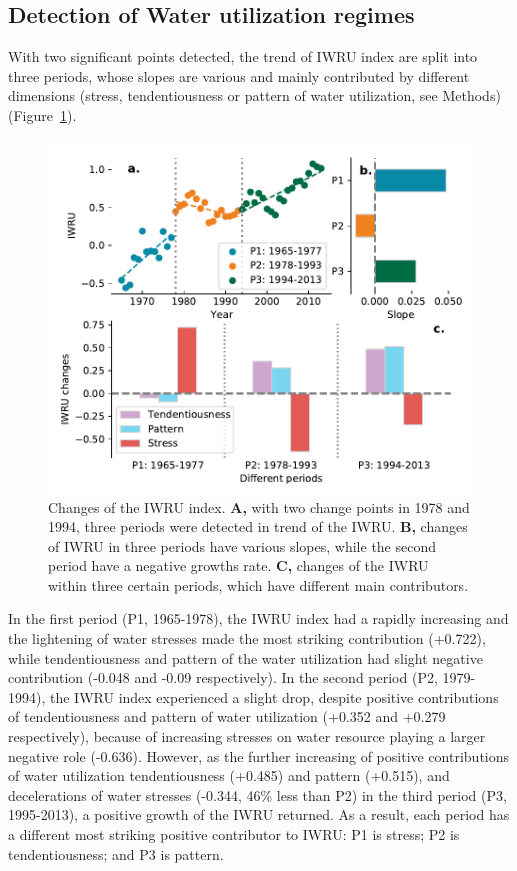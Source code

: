 \documentclass[9pt, twocolumn, twoside, lineno]{pnas-new}
\begin{document}
\subsection*{Detection of Water utilization regimes}
With two significant points detected, the trend of IWRU index are split into three periods, whose slopes are various and mainly contributed by different dimensions (stress, tendentiousness or pattern of water utilization, see Methods) (Figure~\ref{fig:IWRU}).
\begin{figure}%
	\centering
	\includegraphics[width=\linewidth]{../../figures/main_text/index.pdf}
	\caption{Changes of the IWRU index. 
	\textbf{A,} with two change points in 1978 and 1994, three periods were detected in trend of the IWRU.
	\textbf{B,} changes of IWRU in three periods have various slopes, while the second period have a negative growths rate.
	\textbf{C,} changes of the IWRU within three certain periods, which have different main contributors.
	}
	\label{fig:IWRU}
\end{figure}
In the first period (P1, 1965-1978), the IWRU index had a rapidly increasing and the lightening of water stresses made the most striking contribution (+0.722), while tendentiousness and pattern of the water utilization had slight negative contribution (-0.048 and -0.09 respectively).
In the second period (P2, 1979-1994), the IWRU index experienced a slight drop, despite positive contributions of tendentiousness and pattern of water utilization (+0.352 and +0.279 respectively), because of increasing stresses on water resource playing a larger negative role (-0.636). 
However, as the further increasing of positive contributions of water utilization tendentiousness (+0.485) and pattern (+0.515), and decelerations of water stresses (-0.344, 46\% less than P2) in the third period (P3, 1995-2013), a positive growth of the IWRU returned.
As a result, each period has a different most striking positive contributor to IWRU: P1 is stress; P2 is tendentiousness; and P3 is pattern.
\end{document}

